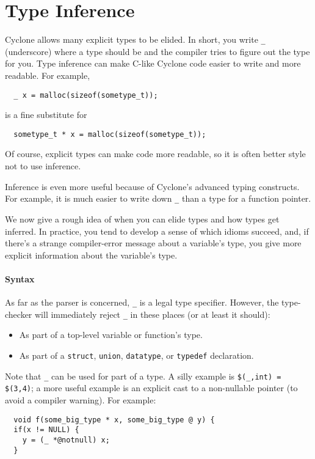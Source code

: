 \section{Type Inference}
\hypertarget{type_inference_sec}{}

Cyclone allows many explicit types to be elided.  In short, you write
\texttt{_} (underscore) where a type should be and the compiler tries to
figure out the type for you.  Type inference can make C-like Cyclone
code easier to write and more readable.  For example,
\begin{verbatim}
  _ x = malloc(sizeof(sometype_t));
\end{verbatim}
is a fine substitute for
\begin{verbatim}
  sometype_t * x = malloc(sizeof(sometype_t));
\end{verbatim}
Of course, explicit types can make code more readable, so it is often
better style not to use inference.

Inference is even more useful because of Cyclone's advanced typing
constructs.  For example, it is much easier to write down \texttt{_}
than a type for a function pointer.  

We now give a rough idea of when you can elide types and how types get
inferred.  In practice, you tend to develop a sense of which idioms
succeed, and, if there's a strange compiler-error message about a
variable's type, you give more explicit information about the
variable's type.

\paragraph{Syntax}
As far as the parser is
concerned, \texttt{_} is a legal type specifier.  However, the type-checker
will immediately reject \texttt{_} in these places (or at least it
should):

\begin{itemize}
\item As part of a top-level variable or function's type.
\item As part of a \texttt{struct}, \texttt{union}, 
 \texttt{datatype}, or
  \texttt{typedef} declaration.
\end{itemize}

Note that \texttt{_} can be used for part of a type.  A silly example is
\texttt{\$(_,int) = \$(3,4)}; a more useful example is an explicit cast to
a non-nullable pointer (to avoid a compiler warning).  For example:
\begin{verbatim}
  void f(some_big_type * x, some_big_type @ y) {
  if(x != NULL) {
    y = (_ *@notnull) x;
  }
\end{verbatim}

